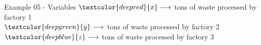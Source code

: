 \begin{frame}{Example 05 - Variables}
\LARGE{
$\textcolor{deepred}  {x} \longrightarrow$
    tons of waste processed by factory 1 \\ \vspace{1cm}
$\textcolor{deepgreen}{y} \longrightarrow$
    tons of waste processed by factory 2 \\ \vspace{1cm}
$\textcolor{deepblue} {z} \longrightarrow$
    tons of waste processed by factory 3
}
\end{frame}
